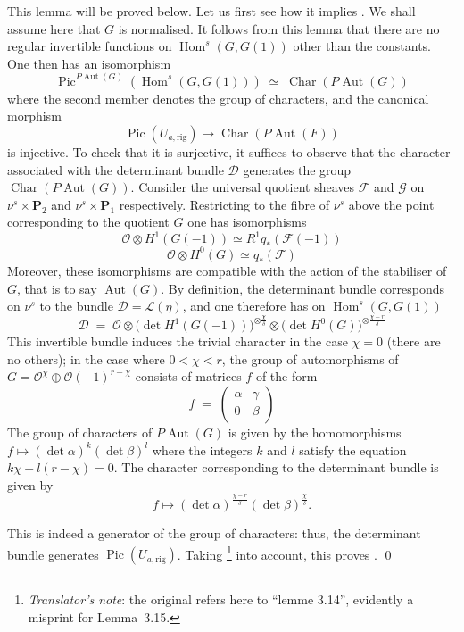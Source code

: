 \documentclass[12pt,english]{smfart}%
\theoremstyle{plain}
\theoremstyle{definition}
\theoremstyle{remark}
\newcommand{\PP}{\mathbf{P}}
\newcommand{\Oh}{\mathcal{O}}
\DeclareMathOperator{\Hom}{Hom}
\DeclareMathOperator{\Aut}{Aut}
\DeclareMathOperator{\Pic}{Pic}
\DeclareMathOperator{\Char}{Char}
\newcommand{\origpage}[1]{\marginnote{\scriptsize\itshape p.~#1}}
\newcommand{\tnote}[1]{\footnote{\emph{Translator's note}: #1}}
\begin{document}
This lemma will be proved below. Let us first see how it implies . We shall assume here that $G$ is normalised. It follows from this lemma that there are no regular invertible functions on $\Hom^{s}(G,G(1))$ other than the constants. One then has an isomorphism
\[
\Pic^{P\Aut(G)}(\Hom^{s}(G,G(1))) \;\simeq\; \Char(P\Aut(G))
\]
where the second member denotes the group of characters, and the canonical morphism
\[
\Pic(U_{a,\mathrm{rig}}) \longrightarrow \Char(P\Aut(F))
\]
is injective. To check that it is surjective, it suffices to observe that the character associated with the determinant bundle $\mathscr{D}$ generates the group $\Char(P\Aut(G))$. Consider the universal quotient sheaves $\mathscr{F}$ and $\mathscr{G}$ on $\nu^{s}\times\PP_{2}$ and
\origpage{651}%
$\nu^{s}\times\PP_{1}$ respectively. Restricting to the fibre of $\nu^{s}$ above the point corresponding to the quotient $G$ one has isomorphisms
\[
\Oh\otimes H^{1}(G(-1)) \simeq R^{1}q_{*}(\mathscr{F}(-1))
\]
\[
\Oh\otimes H^{0}(G) \simeq q_{*}(\mathscr{F})
\]
Moreover, these isomorphisms are compatible with the action of the stabiliser of $G$, that is to say $\Aut(G)$. By definition, the determinant bundle corresponds on $\nu^{s}$ to the bundle $\mathscr{D}=\mathscr{L}(\eta)$, and one therefore has on $\Hom^{s}(G,G(1))$
\[
\mathscr{D} \;=\; \Oh \otimes \bigl(\det H^{1}(G(-1))\bigr)^{\otimes \frac{\chi}{\delta}}
\otimes \bigl(\det H^{0}(G)\bigr)^{\otimes \frac{\chi-r}{\delta}}
\]
This invertible bundle induces the trivial character in the case $\chi=0$ (there are no others); in the case where $0<\chi<r$, the group of automorphisms of $G=\Oh^{\chi}\oplus\Oh(-1)^{r-\chi}$ consists of matrices $f$ of the form
\[
f \;=\; \begin{pmatrix} \alpha & \gamma \\ 0 & \beta \end{pmatrix}
\]
The group of characters of $P\Aut(G)$ is given by the homomorphisms $f\mapsto(\det\alpha)^{k}(\det\beta)^{l}$ where the integers $k$ and $l$ satisfy the equation $k\chi+l(r-\chi)=0$. The character corresponding to the determinant bundle is given by
\[
f \longmapsto (\det\alpha)^{\frac{\chi-r}{\delta}} (\det\beta)^{\frac{\chi}{\delta}}.
\]

This is indeed a generator of the group of characters: thus, the determinant bundle generates $\Pic(U_{a,\mathrm{rig}})$. Taking \tnote{the original refers here to ``lemme 3.14'', evidently a misprint for Lemma~3.15.} into account, this proves . \qed
\end{document}
